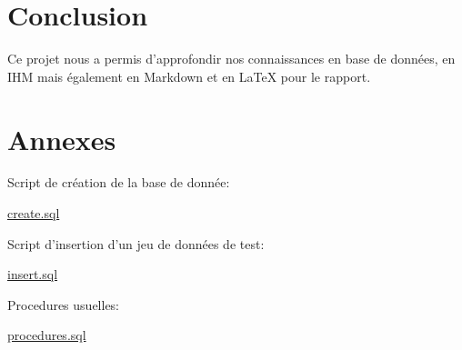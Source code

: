 \documentclass[]{article}
\begin{document}
\section{Conclusion}\label{conclusion}

Ce projet nous a permis d'approfondir nos connaissances en base de données,
en IHM mais également en Markdown et en LaTeX pour le rapport.

\section{Annexes}\label{annexes}

Script de création de la base de donnée:

\href{../../script/create.sql}{create.sql}

Script d'insertion d'un jeu de données de test:

\href{../../script/insert.sql}{insert.sql}

Procedures usuelles:

\href{../../script/procedures.sql}{procedures.sql}
\end{document}
